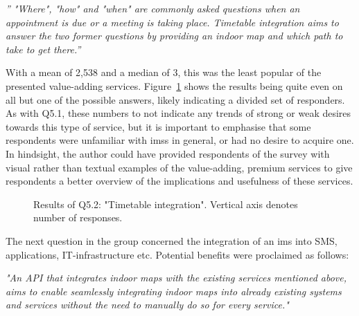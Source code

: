 \begin{displayquote}
\textit{'' "Where", "how" and "when" are commonly asked questions when an appointment is due or a meeting is taking place. Timetable integration aims to answer the two former questions by providing an indoor map and which path to take to get there.''}
\end{displayquote}

With a mean of 2,538 and a median of 3, this was the least popular of the presented value-adding services. Figure~\ref{fig:q52} shows the results being quite even on all but one of the possible answers, likely indicating a divided set of responders. As with Q5.1, these numbers to not indicate any trends of strong or weak desires towards this type of service, but it is important to emphasise that some respondents were unfamiliar with \glspl{ims} in general, or had no desire to acquire one. In hindsight, the author could have provided respondents of the survey with visual rather than textual examples of the value-adding, premium services to give respondents a better overview of the implications and usefulness of these services. 


\begin{figure}[H]
    \centering
    \caption{Results of Q5.2: "Timetable integration". Vertical axis denotes number of responses.}
    \label{fig:q52}
\end{figure}


The next question in the group concerned the integration of an \gls{ims} into SMS, applications, IT-infrastructure etc. Potential benefits were proclaimed as follows:

\begin{displayquote}
\textit{"An API that integrates indoor maps with the existing services mentioned above, aims to enable seamlessly integrating indoor maps into already existing systems and services without the need to manually do so for every service."}
\end{displayquote}

